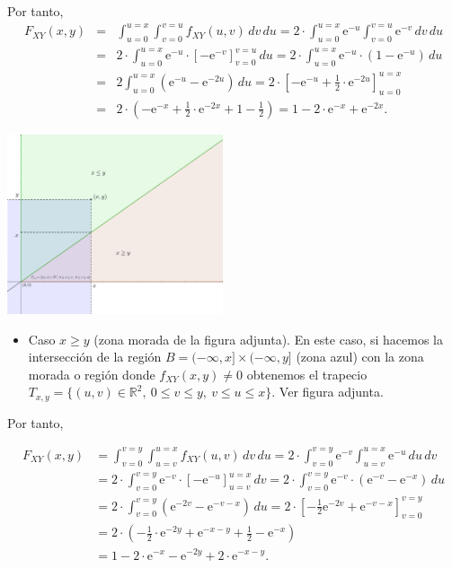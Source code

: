 \documentclass[
  letterpaper,
  DIV=11,
  numbers=noendperiod]{scrreprt}
\providecommand{\tightlist}{%
  \setlength{\itemsep}{0pt}\setlength{\parskip}{0pt}}\usepackage{longtable,booktabs,array}
\begin{document}
Por tanto, \[
\begin{array}{lcr}
F_{XY}(x,y) & = & \int_{u=0}^{u=x}\int_{v=0}^{v=u} f_{XY}(u,v)\,dv\,du= 2 \cdot\int_{u=0}^{u=x} \mathrm{e}^{-u}\int_{v=0}^{v=u}  \mathrm{e}^{-v}\,dv\,du\\ &  = & 
2 \cdot\int_{u=0}^{u=x} \mathrm{e}^{-u}\cdot\left[-\mathrm{e}^{-v}\right]_{v=0}^{v=u}\, du =  2 \cdot\int_{u=0}^{u=x} \mathrm{e}^{-u} \cdot (1-\mathrm{e}^{-u})\, du 
\\ & = & 2 \int_{u=0}^{u=x} \left(\mathrm{e}^{-u}-\mathrm{e}^{-2u}\right)\, du=2\cdot \left[-\mathrm{e}^{-u}+\frac{1}{2}\cdot\mathrm{e}^{-2u}\right]_{u=0}^{u=x}  \\ & = &
2\cdot\left(-\mathrm{e}^{-x}+\frac{1}{2}\cdot\mathrm{e}^{-2x}+1-\frac{1}{2}\right) =1-2\cdot\mathrm{e}^{-x}+\mathrm{e}^{-2x}.
\end{array}
\]

\includegraphics[width=2.5in,height=\textheight]{Images/Ejemplo2Bidi3.png}

\begin{itemize}
\tightlist
\item
  Caso \(x\geq y\) (zona morada de la figura adjunta). En este caso, si
  hacemos la intersección de la región
  \(B=(-\infty,x]\times (-\infty,y]\) (zona azul) con la zona morada o
  región donde \(f_{XY}(x,y)\neq 0\) obtenemos el trapecio
  \(T_{x,y}=\{(u,v)\in\mathbb{R}^2,\ 0\leq v\leq y,\ v\leq u\leq x\}.\)
  Ver figura adjunta.
\end{itemize}

Por tanto,

\[
\begin{array}{rl}
F_{XY}(x,y) &=  \int_{v=0}^{v=y}\int_{u=v}^{u=x} f_{XY}(u,v)\,dv\,du= 2\cdot\int_{v=0}^{v=y} \mathrm{e}^{-v}\int_{u=v}^{u=x} \mathrm{e}^{-u}\,du\,dv \\
&=  2 \cdot\int_{v=0}^{v=y} \mathrm{e}^{-v}\cdot\left[-\mathrm{e}^{-u}\right]_{u=v}^{u=x}\, dv  = 2 \cdot\int_{v=0}^{v=y} \mathrm{e}^{-v}\cdot (\mathrm{e}^{-v}-\mathrm{e}^{-x})\, du \\ 
&=  2 \cdot\int_{v=0}^{v=y} \left(\mathrm{e}^{-2v}-\mathrm{e}^{-v-x}\right)\, du=2 \cdot\left[-\frac{1}{2}\mathrm{e}^{-2v}+\mathrm{e}^{-v-x}\right]_{v=0}^{v=y}  
\\ &=  2\cdot\left(-\frac{1}{2}\cdot\mathrm{e}^{-2y}+\mathrm{e}^{-x-y}+\frac{1}{2}-\mathrm{e}^{-x}\right) \\&=  1-2\cdot\mathrm{e}^{-x}-\mathrm{e}^{-2y}+2\cdot\mathrm{e}^{-x-y}.
\end{array}
\]
\end{document}
